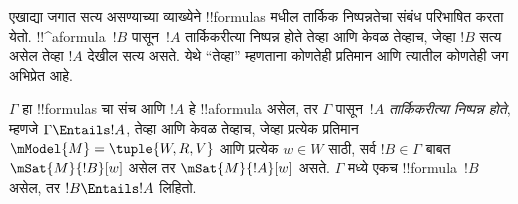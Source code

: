 \documentclass[../../../include/open-logic-section]{subfiles}
\begin{document}


\begin{explain}
  एखाद्या जगात सत्य असण्याच्या व्याख्येने !!{formula}s मधील
  तार्किक निष्पन्नतेचा संबंध परिभाषित करता येतो.
  !!^a{formula}~$!B$ पासून~$!A$ तार्किकरीत्या निष्पन्न
  होते तेव्हा आणि केवळ तेव्हाच, जेव्हा $!B$ सत्य असेल
  तेव्हा $!A$ देखील सत्य असते. येथे ``तेव्हा'' म्हणताना
  कोणतेही प्रतिमान आणि त्यातील कोणतेही जग अभिप्रेत आहे.
\end{explain}

\begin{defn}
  $\Gamma$ हा !!{formula}s चा संच आणि $!A$ हे !!a{formula}
  असेल, तर $\Gamma$ पासून~$!A$ \emph{तार्किकरीत्या
  निष्पन्न होते}, म्हणजे $\Gamma \Entails !A$, तेव्हा आणि
  केवळ तेव्हाच, जेव्हा प्रत्येक प्रतिमान
  $\mModel{M} = \tuple{W, R, V}$ आणि प्रत्येक $w \in W$
  साठी, सर्व $!B \in \Gamma$ बाबत $\mSat{M}{!B}[w]$
  असेल तर $\mSat{M}{!A}[w]$ असते. $\Gamma$ मध्ये
  एकच !!{formula}~$!B$ असेल, तर $!B \Entails !A$ लिहितो.
\end{defn}
\end{document}
